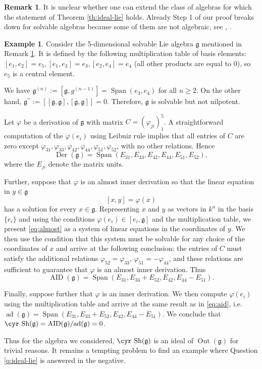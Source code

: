 \documentclass[11pt,reqno]{amsart}
\numberwithin{equation}{section}
\theoremstyle{definition}
\newtheorem{example}[theorem]{Example}
\newtheorem{remark}[theorem]{Remark}
\newcommand{\Out}{{\operatorname{ Out}}}
\newcommand{\AID}{{\operatorname{ AID}}}
\newcommand{\Der}{{\operatorname{ Der}}}
\newcommand{\ad}{{\operatorname{ ad}}}
\newcommand{\Span}{{\operatorname{Span}}}
\newcommand{\ph}{\varphi}
\def\Sha{\text{\cyr Sh}}
\def\g{\mathfrak g}
\begin{document}
\begin{remark} \label{rem:Milne}
It is unclear whether one can extend the class of algebras for which the statement
of Theorem \ref{th:ideal-lie} holds. Already Step 1 of our proof breaks down for
solvable algebras because some of them are not algebraic, see
\cite[\S 5, Ex.~6 on p.~126]{Bou}, \cite[1.25, 3.42]{Mi}.
\end{remark}

\begin{example}
Consider the 5-dimensional solvable Lie algebra $\g$ mentioned in Remark \ref{rem:Milne}.
It is defined by the following multiplication table of basis elements:
$[e_1,e_2]=e_5,
[e_1,e_3]=e_3,
[e_2,e_4]=e_4$
(all other products are equal to $0$),
so $e_5$ is a central element.

We have $\g^{(n)}:=[\g,g^{(n-1)}]=\Span(e_3,e_4)$ for all $n\geq 2$.
On the other hand, $\g^{\prime\prime}:=[[\g,\g],[\g,\g]]=0$. Therefore, $\g$
is solvable but not nilpotent.

Let $\ph$ be a derivation of $\g$ with matrix $C=(\ph_{ji})_1^5$. A straightforward
computation of the $\ph (e_i)$ using Leibniz rule implies that all entries of $C$ are
zero except $\ph_{31}, \ph_{33}, \ph_{42}, \ph_{44}, \ph_{51}, \ph_{52}$, with no other
relations. Hence
\[
\Der(\g)=\Span(E_{31},E_{33},E_{42},E_{44},E_{51},E_{52}),
\]
where the $E_{ji}$ denote the matrix units.

Further, suppose that $\ph$ is an almost inner derivation so that the linear equation in $y\in \g$
\begin{equation} \label{eq:almost}
[x,y]=\ph(x)
\end{equation}
has a solution for every $x\in\g$. Representing $x$ and $y$ as vectors in $k^n$ in the
basis $\{e_i\}$ and using the conditions $\ph (e_i)\in [e_i,\g]$ and the multiplication table,
we present \eqref{eq:almost} as a system of linear equations in the coordinates of $y$.
We then use the condition that this system must be solvable for any choice of the
coordinates of $x$ and arrive at the following conclusion: the entries of $C$ must satisfy
the additional relations $\ph_{52}=\ph_{33}$, $\ph_{51}=-\ph_{44}$, and these relations are sufficient to
guarantee that $\ph$ is an almost inner derivation. Thus
\begin{equation} \label{eq:aid}
\AID(\g)=\Span(E_{31},E_{33}+E_{52}, E_{42}, E_{44}- E_{51}).
\end{equation}

Finally, suppose further that $\ph$ is an inner derivation. We then compute $\ph(e_i)$ using the
multiplication table and arrive at the same result as in \eqref{eq:aid}, i.e.
$\ad(\g)=\Span(E_{31},E_{33}+E_{52}, E_{42}, E_{44}- E_{51}).$ We conclude that $\Sha(\g)=\AID(\g)/\ad(\g)=0$.

Thus for the algebra we considered, $\Sha (\g)$ is an ideal of $\Out (\g)$ for trivial reasons.
It remains a tempting problem to find an example where Question \ref{q:ideal-lie} is answered
in the negative.
\end{example}
\end{document}
